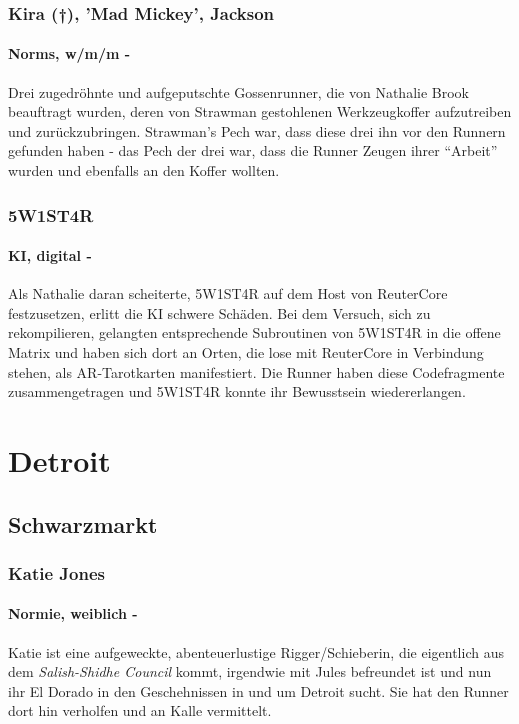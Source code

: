     \subsubsection{Kira (\textsf{†}), 'Mad Mickey', Jackson}
    \paragraph{Norms, w/m/m -} Drei zugedröhnte und aufgeputschte Gossenrunner, die von Nathalie Brook beauftragt wurden, deren von Strawman gestohlenen Werkzeugkoffer aufzutreiben und zurückzubringen. Strawman's Pech war, dass diese drei ihn vor den Runnern gefunden haben - das Pech der drei war, dass die Runner Zeugen ihrer ``Arbeit'' wurden und ebenfalls an den Koffer wollten.
    
    \subsubsection{5W1ST4R}
    \paragraph{KI, digital -} Als Nathalie daran scheiterte, 5W1ST4R auf dem Host von ReuterCore festzusetzen, erlitt die KI schwere Schäden. Bei dem Versuch, sich zu rekompilieren, gelangten entsprechende Subroutinen von 5W1ST4R in die offene Matrix und haben sich dort an Orten, die lose mit ReuterCore in Verbindung stehen, als AR-Tarotkarten manifestiert. Die Runner haben diese Codefragmente zusammengetragen und 5W1ST4R konnte ihr Bewusstsein wiedererlangen.
    
    



\section{Detroit}

\subsection{Schwarzmarkt}

    \subsubsection{Katie Jones}
    \paragraph{Normie, weiblich -} Katie ist eine aufgeweckte, abenteuerlustige Rigger/Schieberin, die eigentlich aus dem \textit{Salish-Shidhe Council} kommt, irgendwie mit Jules befreundet ist und nun ihr El Dorado in den Geschehnissen in und um Detroit sucht. Sie hat den Runner dort hin verholfen und an Kalle vermittelt.
    
